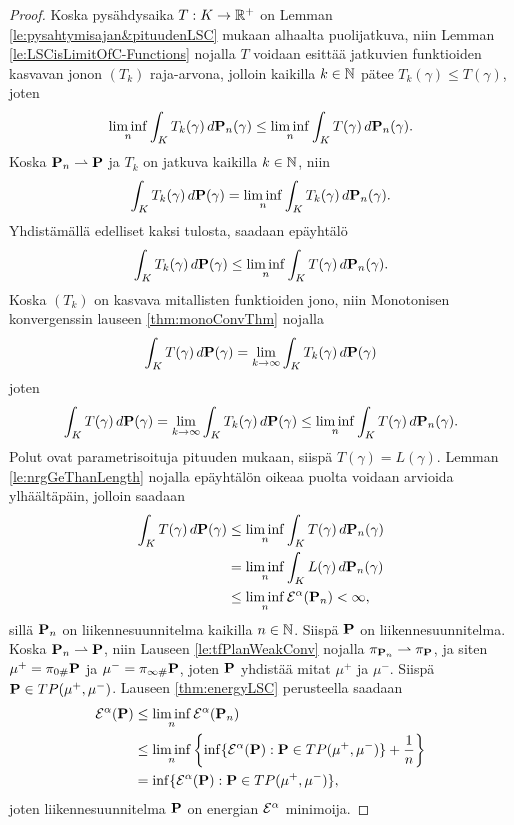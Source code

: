 \begin{proof}
    Koska pysähdysaika ${T:K \to \Rp}$ on Lemman \ref{le:pysahtymisajan&pituudenLSC} mukaan alhaalta puolijatkuva, niin
    Lemman \ref{le:LSCisLimitOfC-Functions} nojalla $T$ voidaan esittää jatkuvien funktioiden kasvavan jonon $(T_k)$ raja-arvona, jolloin kaikilla $k \in \N$ pätee $T_k(\gamma) \le T(\gamma)$, joten
    \begin{equation*}
        \liminf_n \int_K T_k(\gamma) \, d\P_n(\gamma) \le \liminf_n \int_K T(\gamma)\, d\P_n(\gamma).
    \end{equation*}
    Koska $\P_n \rightharpoonup \P$ ja $T_k$ on jatkuva kaikilla $k \in \N$, niin
    \begin{equation*}
        \int_K T_k(\gamma) \, d\P(\gamma) = \liminf_{n} \int_K T_k(\gamma)\, d\P_n(\gamma).
    \end{equation*}
    Yhdistämällä edelliset kaksi tulosta, saadaan epäyhtälö
    \begin{equation*}\label{eq:mainThmMonoConv}
        \int_K T_k(\gamma) \, d\P(\gamma) \le \liminf_n \int_K T(\gamma) \, d\P_n(\gamma).
    \end{equation*}
    Koska $(T_k)$ on kasvava mitallisten funktioiden jono, niin Monotonisen konvergenssin lauseen \ref{thm:monoConvThm} nojalla 
    \begin{equation*}
        \int_K T(\gamma) \, d\P(\gamma) = \lim_{k\to \infty}\int_K T_k(\gamma)\, d\P(\gamma) 
    \end{equation*}
    joten
    \begin{equation*}
        \int_K T(\gamma) \, d\P(\gamma) = \lim_{k\to \infty}\int_K T_k(\gamma)\, d\P(\gamma)  \le \liminf_n \int_K T(\gamma) \, d\P_n(\gamma).
    \end{equation*}
    Polut ovat parametrisoituja pituuden mukaan, siispä {$T(\gamma) = L(\gamma)$}. Lemman \ref{le:nrgGeThanLength} nojalla epäyhtälön oikeaa puolta voidaan arvioida ylhäältäpäin, jolloin saadaan
    \begin{align*}
        \int_K T(\gamma) \, d\P(\gamma) &\le \liminf_n \int_K T(\gamma) \, d\P_n(\gamma) \\
        & = \liminf_n \int_K L(\gamma) \, d\P_n(\gamma) \\
        & \le \liminf_n \E^\alpha(\P_n) < \infty,
    \end{align*}
    sillä $\P_n$ on liikennesuunnitelma kaikilla $n \in \N$. Siispä $\P$ on liikennesuunnitelma. Koska $\P_n \rightharpoonup \P$, niin Lauseen \ref{le:tfPlanWeakConv} nojalla $\pi_{\P_n} \rightharpoonup \pi_{\P}$, ja siten $\mu^+ = \pi_{0\#} \P$ ja $\mu^- = \pi_{\infty \#} \P$, joten $\P$ yhdistää mitat $\mu^+$ ja $\mu^-$. Siispä $\P \in TP(\mu^+, \mu^-)$. Lauseen \ref{thm:energyLSC} perusteella saadaan
    \begin{align*}
        \E^\alpha(\P) &\le \liminf_n \E^\alpha (\P_n) \\
        &\le \liminf_n \left\{\inf\{\E^\alpha(\P): \P\in TP(\mu^+, \mu^-)\} + \frac{1}{n}\right\} \\
        &= \inf\{\E^\alpha(\P): \P\in TP(\mu^+, \mu^-)\},
    \end{align*}
    joten liikennesuunnitelma $\P$ on energian $\E^\alpha$ minimoija.
\end{proof}

